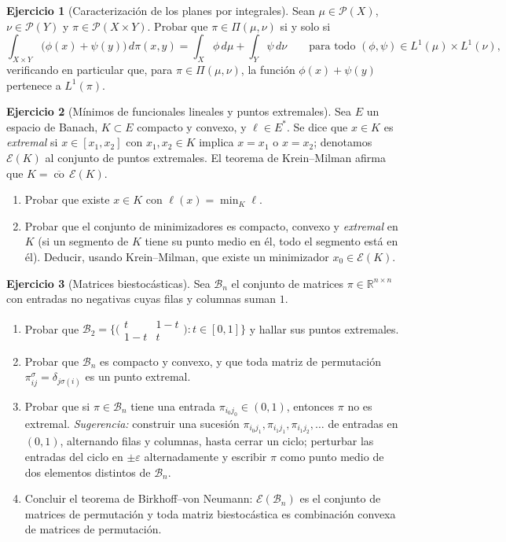 \documentclass[12pt, a4paper]{amsbook}
\newcommand{\ve}{\varepsilon}
\newcommand{\R}{{\mathbb R}}
\newcommand{\Ec}{{\mathcal E}}
\newcommand{\B}{{\mathcal B}}
\theoremstyle{remark}
\theoremstyle{definition}
\newtheorem{ejercicio}{Ejercicio}[chapter]
\numberwithin{section}{chapter}
\numberwithin{subsection}{section}
\numberwithin{equation}{section}
\numberwithin{figure}{chapter}
\begin{document}
\begin{ejercicio}[Caracterización de los planes por integrales]\label{ejer.planes.integrales}
Sean $\mu\in\mathcal P(X)$, $\nu\in\mathcal P(Y)$ y $\pi\in\mathcal P(X\times Y)$.
Probar que $\pi\in\Pi(\mu,\nu)$ si y solo si
\[
\int_{X\times Y}\bigl(\phi(x)+\psi(y)\bigr)\,d\pi(x,y)
=\int_X\phi\,d\mu+\int_Y\psi\,d\nu
\qquad\text{para todo }(\phi,\psi)\in L^1(\mu)\times L^1(\nu),
\]
verificando en particular que, para $\pi\in\Pi(\mu,\nu)$, la función
$\phi(x)+\psi(y)$ pertenece a $L^1(\pi)$.
\end{ejercicio}

\begin{ejercicio}[Mínimos de funcionales lineales y puntos extremales]\label{ejer.krein.milman}
Sea $E$ un espacio de Banach, $K\subset E$ compacto y convexo, y
$\ell\in E^*$. Se dice que $x\in K$ es \emph{extremal} si
$x\in[x_1,x_2]$ con $x_1,x_2\in K$ implica $x=x_1$ o $x=x_2$; denotamos
$\Ec(K)$ al conjunto de puntos extremales. El teorema de Krein--Milman
afirma que $K=\overline{\operatorname{co}}\,\Ec(K)$.
\begin{enumerate}[label=(\alph*)]
\item Probar que existe $x\in K$ con $\ell(x)=\min_K\ell$.
\item Probar que el conjunto de minimizadores es compacto, convexo y
\emph{extremal} en $K$ (si un segmento de $K$ tiene su punto medio en él,
todo el segmento está en él). Deducir, usando Krein--Milman, que existe un
minimizador $x_0\in\Ec(K)$.
\end{enumerate}
\end{ejercicio}

\begin{ejercicio}[Matrices biestocásticas]\label{ejer.biestocasticas}
Sea $\B_n$ el conjunto de matrices $\pi\in\R^{n\times n}$ con entradas no
negativas cuyas filas y columnas suman $1$.
\begin{enumerate}[label=(\alph*)]
\item Probar que
$\B_2=\bigl\{\bigl(\begin{smallmatrix}t&1-t\\1-t&t\end{smallmatrix}\bigr):t\in[0,1]\bigr\}$
y hallar sus puntos extremales.
\item Probar que $\B_n$ es compacto y convexo, y que toda matriz de
permutación $\pi^\sigma_{ij}=\delta_{j\sigma(i)}$ es un punto extremal.
\item Probar que si $\pi\in\B_n$ tiene una entrada $\pi_{i_0j_0}\in(0,1)$,
entonces $\pi$ no es extremal. \emph{Sugerencia:} construir una sucesión
$\pi_{i_0j_1},\pi_{i_1j_1},\pi_{i_1j_2},\dots$ de entradas en $(0,1)$,
alternando filas y columnas, hasta cerrar un ciclo; perturbar las entradas
del ciclo en $\pm\ve$ alternadamente y escribir $\pi$ como punto medio de dos
elementos distintos de $\B_n$.
\item Concluir el teorema de Birkhoff--von Neumann: $\Ec(\B_n)$ es el
conjunto de matrices de permutación y toda matriz biestocástica es
combinación convexa de matrices de permutación.
\end{enumerate}
\end{ejercicio}
\end{document}
